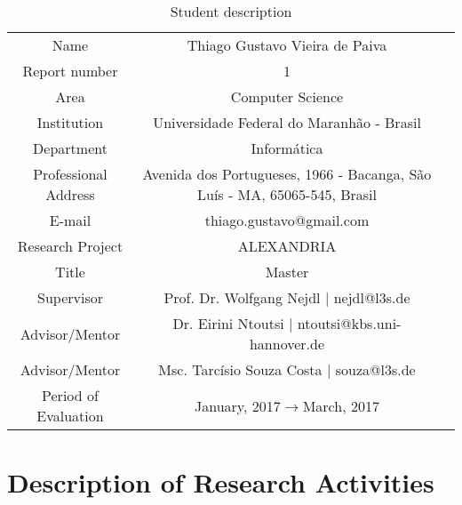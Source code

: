 \documentclass[a4paper,11pt]{report}
\begin{document}
\begin{table} [!htb]
\begin{center}
\begin{tabular}{|l|l|l}
\cline{1-2}
\multicolumn{1}{|c|}{Name} & \multicolumn{1}{c|}{Thiago Gustavo Vieira de Paiva}
&
\\
\cline{1-2}
\multicolumn{1}{|c|}{Report number} & \multicolumn{1}{c|}{1} &  \\
\cline{1-2}
\multicolumn{1}{|c|}{Area} & \multicolumn{1}{c|}{Computer Science} &  \\ 
\cline{1-2}
\multicolumn{1}{|c|}{Institution} & \multicolumn{1}{c|}{Universidade Federal do
Maranhão - Brasil} & \\
\cline{1-2}
\multicolumn{1}{|c|}{Department} & \multicolumn{1}{c|}{Informática} &\\
\cline{1-2}
\multicolumn{1}{|c|}{Professional Address} & \multicolumn{1}{c|}{
Avenida dos Portugueses, 1966 - Bacanga, São Luís - MA, 65065-545, Brasil} &
\\
\cline{1-2}
\multicolumn{1}{|c|}{E-mail} &
\multicolumn{1}{c|}{thiago.gustavo@gmail.com} &\\
\cline{1-2}
\multicolumn{1}{|c|}{Research Project} &
\multicolumn{1}{c|}{ALEXANDRIA}
&
\\
\cline{1-2}
\multicolumn{1}{|c|}{Title} & \multicolumn{1}{|c|}{Master} \\
\cline{1-2}
\multicolumn{1}{|c|}{Supervisor} & \multicolumn{1}{|c|}{Prof. Dr. Wolfgang
Nejdl | nejdl@l3s.de} \\
\cline{1-2}
\multicolumn{1}{|c|}{Advisor/Mentor} & \multicolumn{1}{|c|}{Dr. Eirini Ntoutsi
| ntoutsi@kbs.uni-hannover.de} \\
\cline{1-2}
\multicolumn{1}{|c|}{Advisor/Mentor} & \multicolumn{1}{|c|}{Msc. Tarcísio Souza
Costa | souza@l3s.de}
\\
\cline{1-2}
\multicolumn{1}{|c|}{Period of Evaluation} &
 \multicolumn{1}{c|}{January, 2017$\rightarrow$March, 2017} \\
\cline{1-2}
\end{tabular}

\caption{Student description}
\end{center}
\label{tab:work}
\end{table}


\chapter{Description of Research Activities}
\end{document}
